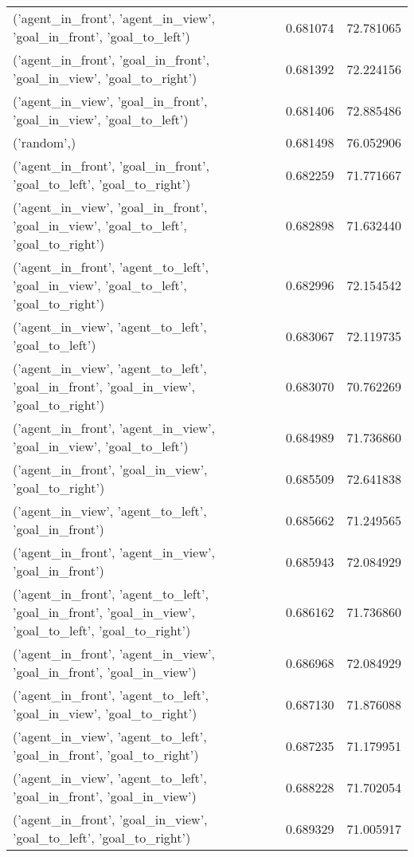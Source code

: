 \begin{tabular}{lrr}
('agent\_in\_front', 'agent\_in\_view', 'goal\_in\_front', 'goal\_to\_left') & 0.681074 & 72.781065 \\
('agent\_in\_front', 'goal\_in\_front', 'goal\_in\_view', 'goal\_to\_right') & 0.681392 & 72.224156 \\
('agent\_in\_view', 'goal\_in\_front', 'goal\_in\_view', 'goal\_to\_left') & 0.681406 & 72.885486 \\
('random',) & 0.681498 & 76.052906 \\
('agent\_in\_front', 'goal\_in\_front', 'goal\_to\_left', 'goal\_to\_right') & 0.682259 & 71.771667 \\
('agent\_in\_view', 'goal\_in\_front', 'goal\_in\_view', 'goal\_to\_left', 'goal\_to\_right') & 0.682898 & 71.632440 \\
('agent\_in\_front', 'agent\_to\_left', 'goal\_in\_view', 'goal\_to\_left', 'goal\_to\_right') & 0.682996 & 72.154542 \\
('agent\_in\_view', 'agent\_to\_left', 'goal\_to\_left') & 0.683067 & 72.119735 \\
('agent\_in\_view', 'agent\_to\_left', 'goal\_in\_front', 'goal\_in\_view', 'goal\_to\_right') & 0.683070 & 70.762269 \\
('agent\_in\_front', 'agent\_in\_view', 'goal\_in\_view', 'goal\_to\_left') & 0.684989 & 71.736860 \\
('agent\_in\_front', 'goal\_in\_view', 'goal\_to\_right') & 0.685509 & 72.641838 \\
('agent\_in\_view', 'agent\_to\_left', 'goal\_in\_front') & 0.685662 & 71.249565 \\
('agent\_in\_front', 'agent\_in\_view', 'goal\_in\_front') & 0.685943 & 72.084929 \\
('agent\_in\_front', 'agent\_to\_left', 'goal\_in\_front', 'goal\_in\_view', 'goal\_to\_left', 'goal\_to\_right') & 0.686162 & 71.736860 \\
('agent\_in\_front', 'agent\_in\_view', 'goal\_in\_front', 'goal\_in\_view') & 0.686968 & 72.084929 \\
('agent\_in\_front', 'agent\_to\_left', 'goal\_in\_view', 'goal\_to\_right') & 0.687130 & 71.876088 \\
('agent\_in\_view', 'agent\_to\_left', 'goal\_in\_front', 'goal\_to\_right') & 0.687235 & 71.179951 \\
('agent\_in\_view', 'agent\_to\_left', 'goal\_in\_front', 'goal\_in\_view') & 0.688228 & 71.702054 \\
('agent\_in\_front', 'goal\_in\_view', 'goal\_to\_left', 'goal\_to\_right') & 0.689329 & 71.005917 \\

\end{tabular}
